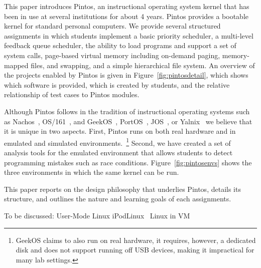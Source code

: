 This paper introduces Pintos, an instructional operating system kernel that 
has been in use at several institutions for about 4 years.  Pintos provides 
a bootable kernel for standard personal computers.  We provide several
structured assignments in which students implement a basic priority
scheduler, a multi-level feedback queue scheduler, the ability to
load programs and support a set of system calls, page-based virtual memory
including on-demand paging, memory-mapped files, and swapping, and a
simple hierarchical file system.  An overview of the projects enabled
by Pintos is given in Figure~\ref{fig:pintosdetail}, which shows which
software is provided, which is created by students, and the relative 
relationship of test cases to Pintos modules.

Although Pintos follows in the tradition of instructional operating systems 
such as Nachos~\cite{Christopher1993Nachos}, OS/161~\cite{Holland2002New}, and
GeekOS~\cite{Hovemeyer2004Running}, 
PortOS~\cite{Atkin2002PortOS},
JOS~\cite{1088822}, or Yalnix~\cite{1088822} 
we believe that it is unique in two
aspects.  First, Pintos runs on both real hardware and in emulated and
simulated environments.~\footnote{GeekOS claims to also run on real hardware, it requires,
however, a dedicated disk and does not support running off USB devices, making
it impractical for many lab settings.}
Second, we have created a set of analysis tools
for the emulated environment that allows students to detect programming
mistakes such as race conditions.  Figure~\ref{fig:pintosenvs} shows
the three environments in which the same kernel can be run.

This paper reports on the design philosophy that underlies Pintos,
details its structure, and outlines the nature and learning goals of each
assignments.

\pintosenvfigure{}

\pintosdetailfigure{}

To be discussed:
User-Mode Linux\cite{1008027}
iPodLinux~\cite{1352199}
Linux in VM\cite{Nieh2005Experiences}

